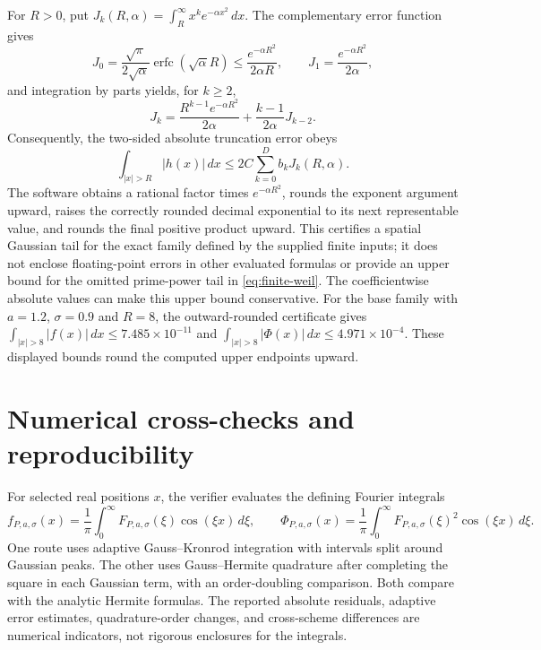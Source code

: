 \documentclass[11pt]{article}
\begin{document}
For $R>0$, put
$J_k(R,\alpha)=\int_R^\infty x^k e^{-\alpha x^2}\,dx$.
The complementary error function gives
\begin{equation}\label{eq:tail-moments}
  J_0=\frac{\sqrt\pi}{2\sqrt\alpha}
       \operatorname{erfc}(\sqrt\alpha R)
       \le\frac{e^{-\alpha R^2}}{2\alpha R},
  \qquad J_1=\frac{e^{-\alpha R^2}}{2\alpha},
\end{equation}
and integration by parts yields, for $k\ge2$,
\begin{equation}\label{eq:tail-recurrence}
  J_k=\frac{R^{k-1}e^{-\alpha R^2}}{2\alpha}
       +\frac{k-1}{2\alpha}J_{k-2}.
\end{equation}
Consequently, the two-sided absolute truncation error obeys
\begin{equation}\label{eq:spatial-tail}
  \int_{|x|>R}|h(x)|\,dx
  \le 2C\sum_{k=0}^{D}b_k J_k(R,\alpha).
\end{equation}
The software obtains a rational factor times $e^{-\alpha R^2}$, rounds
the exponent argument upward, raises the correctly rounded decimal
exponential to its next representable value, and rounds the final positive
product upward. This certifies a spatial Gaussian
tail for the exact family defined by the supplied finite inputs; it does
not enclose floating-point errors in other evaluated formulas or provide
an upper bound for the omitted prime-power tail in \eqref{eq:finite-weil}.
The coefficientwise absolute values can make this upper bound conservative.
For the base family with $a=1.2$, $\sigma=0.9$ and $R=8$, the outward-rounded
certificate gives $\int_{|x|>8}|f(x)|\,dx\le 7.485\times10^{-11}$ and
$\int_{|x|>8}|\Phi(x)|\,dx\le 4.971\times10^{-4}$.
These displayed bounds round the computed upper endpoints upward.

\section{Numerical cross-checks and reproducibility}

For selected real positions $x$, the verifier evaluates the defining
Fourier integrals
\begin{equation}\label{eq:check-integrals}
 f_{P,a,\sigma}(x)
 =\frac1\pi\int_0^\infty F_{P,a,\sigma}(\xi)\cos(\xi x)\,d\xi,
 \qquad
 \Phi_{P,a,\sigma}(x)
 =\frac1\pi\int_0^\infty F_{P,a,\sigma}(\xi)^2
   \cos(\xi x)\,d\xi.
\end{equation}
One route uses adaptive Gauss--Kronrod integration with intervals split
around Gaussian peaks. The other uses Gauss--Hermite quadrature after
completing the square in each Gaussian term, with an order-doubling
comparison. Both compare with the analytic Hermite formulas. The reported
absolute residuals, adaptive error estimates, quadrature-order changes,
and cross-scheme differences are numerical indicators, not rigorous
enclosures for the integrals.
\end{document}
